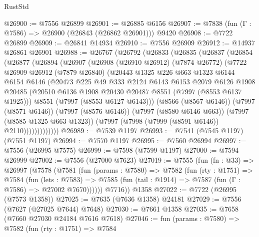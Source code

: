 \begin{lexlean}{RustStd}
\begin{coremodule}
{\begin{coremodule}
{{{{{{{{{{{{{{{{{{{{{{{{{{{{{{{{{{{{{{{{{{{@26900 := @7556 @26899
@26901 := @26885 @6156
@26907 := @7838 (fun (Γ : @7586) => @26900 (@26843 (@26862 @26901))) @9420
@26908 := @7722 @26899
@26909 := @26841 @14934
@26910 := @7556 @26909
@26912 := @14937 @26861 @26901
@26988 := @26767
    (@26792
      (@26833
        (@26835
          (@26837
            (@26854
              (@26877
                (@26894
                  (@26907
                    (@26908
                      (@26910 @26912)
                      (@7874 @26772)
                      (@7722
                        @26909
                        @26912
                        (@7879 @26840)
                        (@20443
                          @1325
                          @226
                          @663
                          @1323
                          @6144
                          @6154
                          @6146
                          (@20473
                            @225
                            @49
                            @333
                            @2124
                            @6143
                            @6153
                            @2079
                            @6126
                            @1908
                            @20485
                            (@20510 @6136 @1908 @20430 @20487 @8551 (@7997 (@8553 @6137 @1925)))
                            @8551
                            (@7997 (@8553 @6127 @6143)))
                          (@8566 (@8567 @6146))
                          (@7997 (@8571 @6146))
                          (@7997 (@8576 @6146))
                          (@7997 (@8580 @6146 @663))
                          (@7997 (@8585 @1325 @663 @1323))
                          (@7997 (@7998 (@7999 (@8591 @6146)) @2110)))))))))))))
@26989 := @7539 @1197
@26993 := @7541 (@7545 @1197) (@7551 @1197)
@26994 := @7570 @1197
@26995 := @7560 @26994
@26997 := @7556 (@26995 @7575)
@26999 := @7598 (@7599 @1197)
@27000 := @7594 @26999
@27002 := @7556 (@27000 @7623)
@27019 := @7555
    (fun (fn : @33) =>
    @26997
      (@7578
        (@7581
          (fun (params : @7580) =>
          @7582
            (fun (rty : @1751) =>
            @7584
              (fun (lets : @7583) =>
              @7585 (fun (tail : @1914) => @7587 (fun (Γ : @7586) => @27002 @7670))))))
        @7716))
    @1358
@27022 := @7722 (@26995 (@7573 @1358))
@27025 := @7635 (@7636 @1358) @24181
@27029 := @7556 (@7627 (@27025 @7644) @7648)
@27030 := @7661 @1358
@27035 := @7658 (@7660 @27030 @24184 @7616 @7618)
@27046 := fun (params : @7580) =>
  @7582
    (fun (rty : @1751) =>
    @7584
}}}}}}}}}}}}}}}}}}}}}}}}}}}}}}}}}}}}}}}}}}}
\end{coremodule}}
\end{coremodule}
\end{lexlean}
